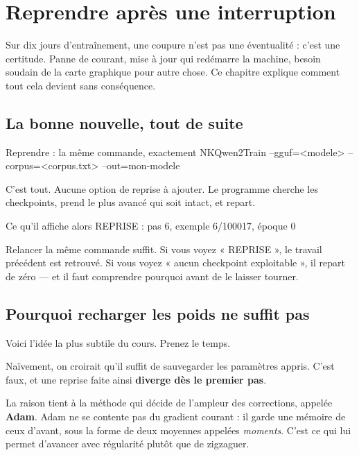 \chapter{Reprendre après une interruption}

Sur dix jours d'entraînement, une coupure n'est pas une éventualité : c'est une
certitude. Panne de courant, mise à jour qui redémarre la machine, besoin
soudain de la carte graphique pour autre chose. Ce chapitre explique comment
tout cela devient sans conséquence.

\section{La bonne nouvelle, tout de suite}

\begin{nkcode}[]{Reprendre : la même commande, exactement}
NKQwen2Train --gguf=<modele> --corpus=<corpus.txt> --out=mon-modele
\end{nkcode}

C'est tout. Aucune option de reprise à ajouter. Le programme cherche les
checkpoints, prend le plus avancé qui soit intact, et repart.

\begin{nkcode}[]{Ce qu'il affiche alors}
REPRISE : pas 6, exemple 6/100017, époque 0
\end{nkcode}

\begin{nkretenir}
Relancer la même commande suffit. Si vous voyez « REPRISE », le travail
précédent est retrouvé. Si vous voyez « aucun checkpoint exploitable », il
repart de zéro — et il faut comprendre pourquoi avant de le laisser tourner.
\end{nkretenir}

\section{Pourquoi recharger les poids ne suffit pas}

Voici l'idée la plus subtile du cours. Prenez le temps.

Naïvement, on croirait qu'il suffit de sauvegarder les paramètres appris. C'est
faux, et une reprise faite ainsi \textbf{diverge dès le premier pas}.

La raison tient à la méthode qui décide de l'ampleur des corrections, appelée
\textbf{Adam}. Adam ne se contente pas du gradient courant : il garde une
mémoire de ceux d'avant, sous la forme de deux moyennes appelées
\emph{moments}. C'est ce qui lui permet d'avancer avec régularité plutôt que de
zigzaguer.

